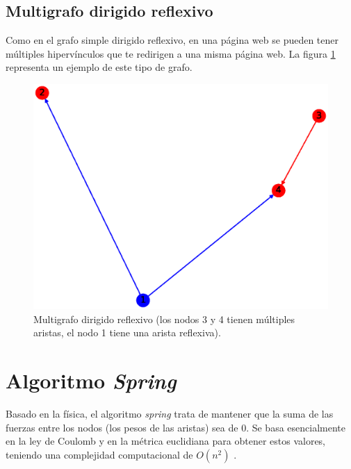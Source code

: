 \documentclass{article}
\begin{document}
\subsection{Multigrafo dirigido reflexivo}
Como en el grafo simple dirigido reflexivo, en una página web se pueden tener múltiples hipervínculos que te redirigen a una misma página web. La figura \ref{fig:MDR} representa un ejemplo de este tipo de grafo.
\begin{figure}[H]
    \includegraphics[width=\textwidth]{12-MDR}
    \caption{Multigrafo dirigido reflexivo (los nodos 3 y 4 tienen múltiples aristas, el nodo 1 tiene una arista reflexiva).}
    \label{fig:MDR}
\end{figure}


\section{Algoritmo \textit{Spring}}
Basado en la física, el algoritmo \textit{spring} trata de mantener que la suma de las fuerzas entre los nodos (los pesos de las aristas) sea de 0. Se basa esencialmente en la ley de Coulomb y en la métrica euclidiana para obtener estos valores, teniendo una complejidad computacional de $O(n^2)$ \cite{spring}.
\end{document}
